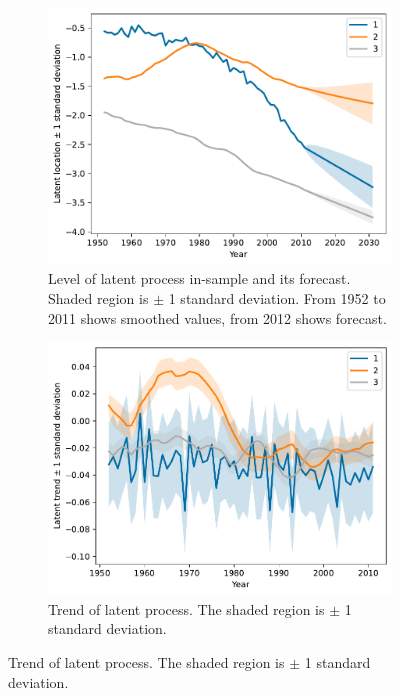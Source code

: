 \documentclass[11pt]{article}
\begin{document}
\begin{figure}
    \centering \begin{subfigure}[t]{0.45\textwidth}
        \centering
        \includegraphics[width=\textwidth]{figs/sweden_linear_1952_2011_Male_100_1_3latent_forecast.pdf}
        \caption{Level of latent process in-sample and its forecast. Shaded region is $\pm$ 1 standard deviation. From 1952 to 2011 shows smoothed values, from 2012 shows forecast.}
    \end{subfigure}
    \hfill
    \begin{subfigure}[t]{0.45\textwidth}
        \centering
        \includegraphics[width=\textwidth]{figs/sweden_linear_1952_2011_Male_100_1_3latent_trend.pdf}
        \caption{Trend of latent process. The shaded region is $\pm$ 1 standard deviation.}

\end{subfigure}
\end{figure}
\end{document}
